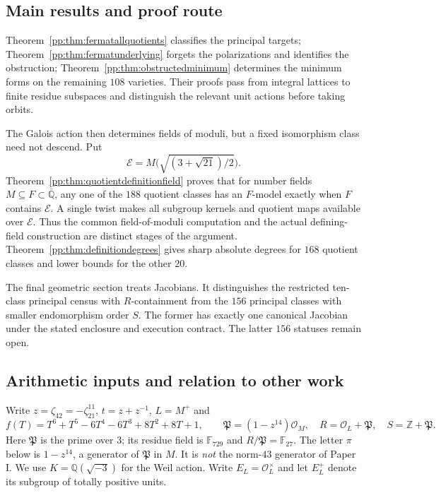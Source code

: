 \subsection{Main results and proof route}
Theorem~\ref{pp:thm:fermatallquotients} classifies the principal targets;
Theorem~\ref{pp:thm:fermatunderlying} forgets the polarizations and identifies
the obstruction; Theorem~\ref{pp:thm:obstructedminimum} determines the
minimum forms on the remaining $108$ varieties. Their proofs pass from
integral lattices to finite residue subspaces and distinguish the relevant
unit actions before taking orbits.

The Galois action then determines fields of moduli, but a fixed isomorphism
class need not descend. Put
\[
 \mathcal E=M\bigl(\sqrt{(3+\sqrt{21})/2}\bigr).
\]
Theorem~\ref{pp:thm:quotientdefinitionfield} proves that for number fields $M\subseteq F\subset\overline{\mathbb Q}$, any one of the $188$ quotient classes has an $F$-model
exactly when $F$ contains $\mathcal E$. A single twist makes all subgroup
kernels and quotient maps available over $\mathcal E$. Thus the common
field-of-moduli computation and the actual defining-field construction
are distinct stages of the argument.
Theorem~\ref{pp:thm:definitiondegrees} gives sharp absolute degrees for
$168$ quotient classes and lower bounds for the other $20$.

The final geometric section treats Jacobians. It distinguishes the
restricted ten-class principal census with $R$-containment from the $156$
principal classes with smaller endomorphism order $S$. The former has
exactly one canonical Jacobian under the stated enclosure and execution
contract. The latter $156$ statuses remain open.

\subsection{Arithmetic inputs and relation to other work}
Write $z=\zeta_{42}=-\zeta_{21}^{11}$, $t=z+z^{-1}$, $L=M^+$ and
\[
 f(T)=T^6+T^5-6T^4-6T^3+8T^2+8T+1,\qquad
 \mathfrak P=(1-z^{14})\mathcal O_M,
 \quad R=\mathcal O_L+\mathfrak P,\quad S=\mathbb Z+\mathfrak P.
\]
Here $\mathfrak P$ is the prime over $3$; its residue field is
$\mathbb F_{729}$ and $R/\mathfrak P=\mathbb F_{27}$. The letter $\pi$
below is $1-z^{14}$, a generator of $\mathfrak P$ in $M$. It is \emph{not} the norm-$43$ generator of
Paper I. We use $K=\mathbb Q(\sqrt{-3})$ for the Weil action.
Write $E_L=\mathcal O_L^\times$ and let $E_L^+$ denote its subgroup
of totally positive units.

